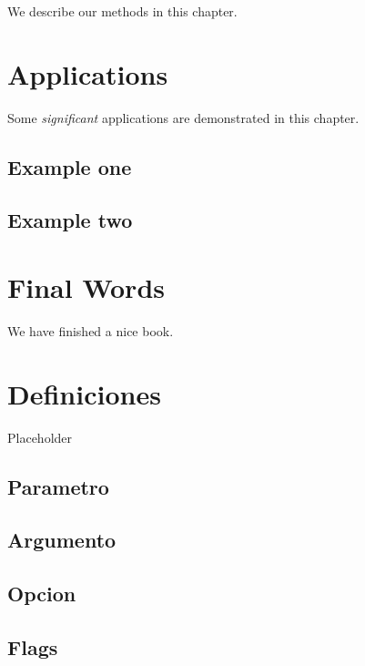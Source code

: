 \documentclass[
]{book}
\begin{document}
We describe our methods in this chapter.

\hypertarget{applications}{%
\chapter{Applications}\label{applications}}

Some \emph{significant} applications are demonstrated in this chapter.

\hypertarget{example-one}{%
\section{Example one}\label{example-one}}

\hypertarget{example-two}{%
\section{Example two}\label{example-two}}

\hypertarget{final-words}{%
\chapter{Final Words}\label{final-words}}

We have finished a nice book.

\hypertarget{definiciones}{%
\chapter{Definiciones}\label{definiciones}}

Placeholder

\hypertarget{parametro}{%
\section{Parametro}\label{parametro}}

\hypertarget{argumento}{%
\section{Argumento}\label{argumento}}

\hypertarget{opcion}{%
\section{Opcion}\label{opcion}}

\hypertarget{flags}{%
\section{Flags}\label{flags}}
\end{document}
